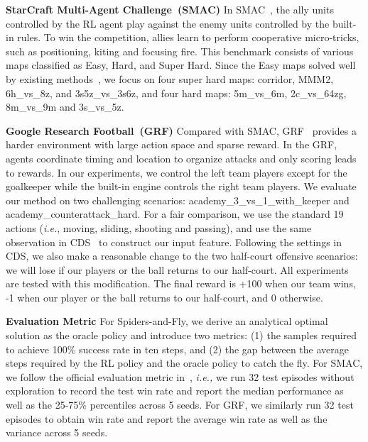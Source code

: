 \documentclass[letterpaper]{article} \usepackage{aaai23}  \usepackage{times}  \usepackage{helvet}  \usepackage{courier}  \usepackage[hyphens]{url}  \usepackage{graphicx} \urlstyle{rm} \def\UrlFont{\rm}  \usepackage{natbib}  \usepackage{caption} \frenchspacing  \setlength{\pdfpagewidth}{8.5in} \setlength{\pdfpageheight}{11in} \usepackage{algorithm}
\begin{document}
\textbf{StarCraft Multi-Agent Challenge~(SMAC)}
In SMAC~\citeyear{smac}, the ally units controlled by the RL agent play against the enemy units controlled by the built-in rules. To win the competition, allies learn to perform cooperative micro-tricks, such as positioning, kiting and focusing fire. This benchmark consists of various maps classified as Easy, Hard, and Super Hard. Since the Easy maps solved well by existing methods~\citeyear{pymarl2}, we focus on four super hard maps: corridor, MMM2, 6h\_vs\_8z, and 3s5z\_vs\_3s6z, and four hard maps: 5m\_vs\_6m, 2c\_vs\_64zg, 8m\_vs\_9m and 3s\_vs\_5z. 

\textbf{Google Research Football~(GRF)}
Compared with SMAC, GRF~\citeyear{grf} provides a harder environment with large action space and sparse reward. 
In the GRF, agents coordinate timing and location to organize attacks and only scoring leads to rewards. In our experiments, we control the left team players except for the goalkeeper while the built-in engine controls the right team players. 
We evaluate our method on two challenging scenarios: academy\_3\_vs\_1\_with\_keeper and academy\_counterattack\_hard.
For a fair comparison, we use the standard 19 actions (\textit{i.e.}, moving, sliding, shooting and passing), and use the same observation in CDS~\citeyear{cds} to construct our input feature. Following the settings in CDS, we also make a reasonable change to the two half-court offensive scenarios: we will lose if our players or the ball returns to our half-court. All experiments are tested with this modification. 
The final reward is +100 when our team wins, -1 when our player or the ball returns to our half-court, and 0 otherwise.

\textbf{Evaluation Metric}
For Spiders-and-Fly, we derive an analytical optimal solution as the oracle policy and introduce two metrics: (1) the samples required to achieve 100\% success rate in ten steps, and (2) the gap between the average steps required by the RL policy and the oracle policy to catch the fly.
For SMAC, we follow the official evaluation metric in~\citeyear{smac}, \textit{i.e.,} we run 32 test episodes without exploration to record the test win rate and report the median performance as well as the 25-75\% percentiles across 5 seeds. For GRF, we similarly run 32 test episodes to obtain win rate and report the average win rate as well as the variance across 5 seeds. 
\end{document}

